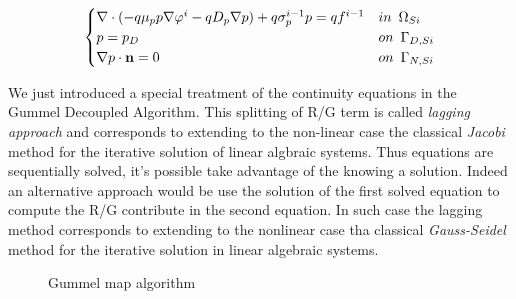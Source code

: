 \begin{equation}
\label{eq: LHC system new}
\begin{cases}
\nabla \cdot (- q\mu_p p \nabla \varphi^i - qD_p \nabla p ) + q\sigma_p^{i-1} p =  qf^{i-1}& in \psp{3} \Omega_{Si}
\\
 p = p_D & on \psp{3} \Gamma_{D,Si}
 \\
 \nabla p \cdot \vect{n} = 0 & on \psp{3} \Gamma_{N,Si}
\end{cases}
\end{equation}

We just introduced a special treatment of the continuity equations in the Gummel Decoupled Algorithm. This splitting of R/G term is called \textit{lagging approach} and corresponds to extending to the non-linear case the classical \textit{Jacobi} method for the iterative  solution of linear algbraic systems. Thus equations are sequentially solved, it's possible take advantage of the knowing a solution. Indeed an alternative approach would be use the solution of the first solved equation to compute the R/G contribute in the second equation. In such case the lagging method corresponds to extending to the nonlinear case tha classical \textit{Gauss-Seidel} method for the iterative solution in linear algebraic systems.


\begin{figure}[!h]
\begin{center}
\caption{Gummel map algorithm}
\label{fig: gummel map}
\end{center}
\end{figure}



